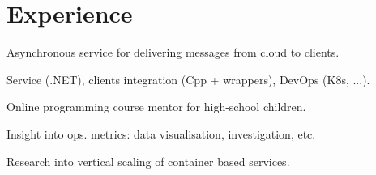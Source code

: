 \documentclass[a4paper]{deedy-resume} %
\begin{document}
\begin{minipage}[t]{0.62\textwidth} %


\section{Experience}


\vspace{\topsep} %
\begin{tightitemize}
\item Asynchronous service for delivering messages from cloud to clients.
\item Service (.NET), clients integration (Cpp + wrappers), DevOps (K8s, ...).
\end{tightitemize}

\halfsectionspace %


\begin{tightitemize}
\item Online programming course mentor for high-school children.
\end{tightitemize}

\halfsectionspace %



\begin{tightitemize}
\item Insight into ops. metrics: data visualisation, investigation, etc.
\item Research into vertical scaling of container based services.
\end{tightitemize}

\halfsectionspace %


\end{minipage}
\end{document}
